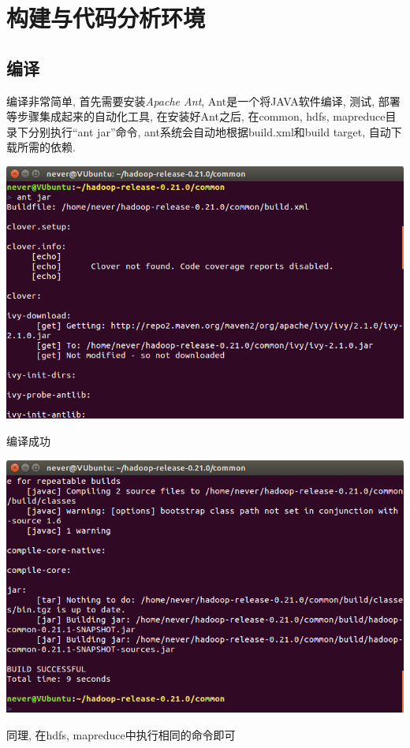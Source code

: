 \chapter{构建与代码分析环境}
\label{ch:env}
\section{编译}


编译{\Hadoop}非常简单, 首先需要安装\emph{Apache Ant}, Ant是一个将JAVA软件编译, 测试,
部署等步骤集成起来的自动化工具, 在安装好Ant之后,
在common, hdfs, mapreduce目录下分别执行``ant jar''命令,
ant系统会自动地根据build.xml和build target, 自动下载所需的依赖.

\includegraphics[width=\textwidth]{image/env/cr0.png}

编译成功

\includegraphics[width=\textwidth]{image/env/cr0.1.png}

同理, 在hdfs, mapreduce中执行相同的命令即可


